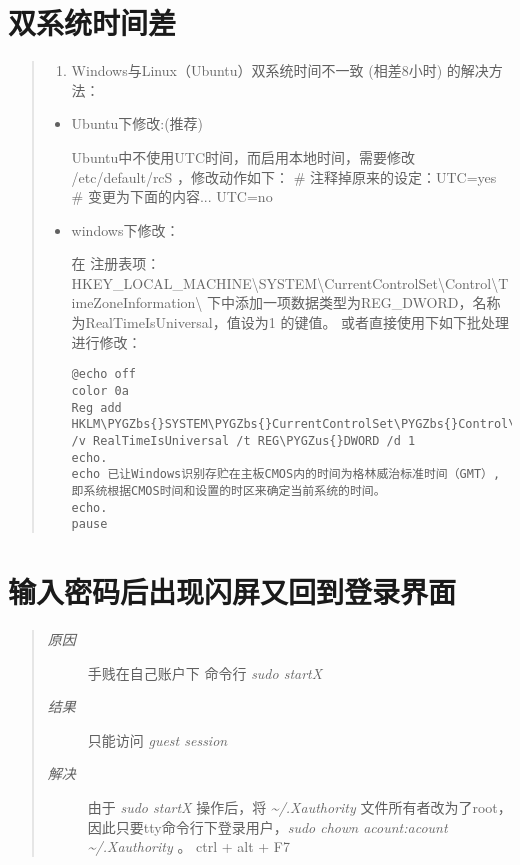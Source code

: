 \documentclass[letterpaper,10pt,english]{sphinxmanual}
\def\PYGZbs{\char`\\}
\def\PYGZus{\char`\_}
\begin{document}
\chapter{双系统时间差}
\label{index:id4}\begin{quote}
\begin{enumerate}
\item {} 
Windows与Linux（Ubuntu）双系统时间不一致 (相差8小时) 的解决方法：

\end{enumerate}
\begin{itemize}
\item {} 
Ubuntu下修改:(推荐)

Ubuntu中不使用UTC时间，而启用本地时间，需要修改 /etc/default/rcS ，修改动作如下：
\# 注释掉原来的设定：UTC=yes
\# 变更为下面的内容...
UTC=no

\item {} 
windows下修改：

在 注册表项：HKEY\_LOCAL\_MACHINE\textbackslash{}SYSTEM\textbackslash{}CurrentControlSet\textbackslash{}Control\textbackslash{}TimeZoneInformation\textbackslash{}
下中添加一项数据类型为REG\_DWORD，名称为RealTimeIsUniversal，值设为1 的键值。
或者直接使用下如下批处理进行修改：

\begin{Verbatim}[commandchars=\\\{\}]
@echo off
color 0a
Reg add HKLM\PYGZbs{}SYSTEM\PYGZbs{}CurrentControlSet\PYGZbs{}Control\PYGZbs{}TimeZoneInformation /v RealTimeIsUniversal /t REG\PYGZus{}DWORD /d 1
echo.
echo 已让Windows识别存贮在主板CMOS内的时间为格林威治标准时间（GMT）,即系统根据CMOS时间和设置的时区来确定当前系统的时间。
echo.
pause
\end{Verbatim}

\end{itemize}
\end{quote}


\chapter{输入密码后出现闪屏又回到登录界面}
\label{index:id5}\begin{quote}
\begin{description}
\item[{\emph{原因}}] \leavevmode
手贱在自己账户下 命令行 \emph{sudo startX}

\item[{\emph{结果}}] \leavevmode
只能访问 \emph{guest session}

\item[{\emph{解决}}] \leavevmode
由于 \emph{sudo startX} 操作后，将 \emph{\textasciitilde{}/.Xauthority} 文件所有者改为了root，
因此只要tty命令行下登录用户，\emph{sudo chown acount:acount \textasciitilde{}/.Xauthority} 。
ctrl + alt + F7

\end{description}
\end{quote}
\end{document}
